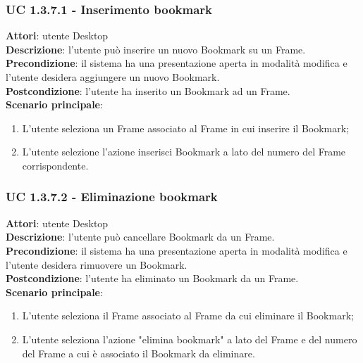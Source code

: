 \subsubsection{UC 1.3.7.1 - Inserimento bookmark}{
	\label{uc1.3.7.1}
	\textbf{Attori}: utente Desktop \\
	\textbf{Descrizione}: l'utente può inserire un nuovo Bookmark su un Frame. \\
	\textbf{Precondizione}: il sistema ha una presentazione aperta in modalità modifica e l'utente desidera aggiungere un nuovo Bookmark.	\\
	\textbf{Postcondizione}: l'utente ha inserito un Bookmark ad un Frame.	\\
	\textbf{Scenario principale}:
	\begin{enumerate}
		\item L'utente seleziona un Frame associato al Frame in cui inserire il Bookmark;
		\item L'utente selezione l'azione inserisci Bookmark a lato del numero del Frame corrispondente.
	\end{enumerate}
}
\subsubsection{UC 1.3.7.2 - Eliminazione bookmark}{
	\label{uc1.3.7.2}
	\textbf{Attori}: utente Desktop \\
	\textbf{Descrizione}: l'utente può cancellare Bookmark da un Frame. \\
	\textbf{Precondizione}: il sistema ha una presentazione aperta in modalità modifica e l'utente desidera rimuovere un Bookmark.	\\
	\textbf{Postcondizione}: l'utente ha eliminato un Bookmark da un Frame.	\\
	\textbf{Scenario principale}:
	\begin{enumerate}
		\item L'utente seleziona il Frame associato al Frame da cui eliminare il Bookmark;
		\item L'utente seleziona l'azione "elimina bookmark" a lato del Frame e del numero del Frame a cui è associato il Bookmark da eliminare.
	\end{enumerate}
}
